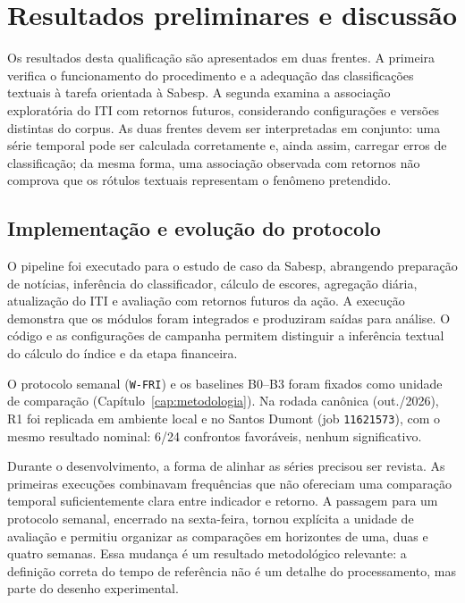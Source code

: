 \chapter{Resultados preliminares e discussão}
\label{cap:resultados}

Os resultados desta qualificação são apresentados em duas frentes. A primeira verifica o funcionamento do procedimento e a adequação das classificações textuais à tarefa orientada à Sabesp. A segunda examina a associação exploratória do ITI com retornos futuros, considerando configurações e versões distintas do corpus. As duas frentes devem ser interpretadas em conjunto: uma série temporal pode ser calculada corretamente e, ainda assim, carregar erros de classificação; da mesma forma, uma associação observada com retornos não comprova que os rótulos textuais representam o fenômeno pretendido.

\section{Implementação e evolução do protocolo}

O pipeline foi executado para o estudo de caso da Sabesp, abrangendo preparação de notícias, inferência do classificador, cálculo de escores, agregação diária, atualização do ITI e avaliação com retornos futuros da ação. A execução demonstra que os módulos foram integrados e produziram saídas para análise. O código e as configurações de campanha permitem distinguir a inferência textual do cálculo do índice e da etapa financeira.

O protocolo semanal (\texttt{W-FRI}) e os baselines B0--B3 foram fixados como unidade de comparação (Capítulo~\ref{cap:metodologia}). Na rodada canônica (out./2026), R1 foi replicada em ambiente local e no Santos Dumont (job \texttt{11621573}), com o mesmo resultado nominal: 6/24 confrontos favoráveis, nenhum significativo.

\iffalse
Durante o desenvolvimento, a forma de alinhar as séries precisou ser revista. As primeiras execuções combinavam frequências que não ofereciam uma comparação temporal suficientemente clara entre indicador e retorno. A passagem para um protocolo semanal, encerrado na sexta-feira, tornou explícita a unidade de avaliação e permitiu organizar as comparações em horizontes de uma, duas e quatro semanas. Essa mudança é um resultado metodológico relevante: a definição correta do tempo de referência não é um detalhe do processamento, mas parte do desenho experimental.

